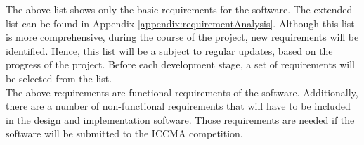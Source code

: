 The above list shows only the basic requirements for the software. The extended list can be found in Appendix \ref{appendix:requirementAnalysis}. Although this list is more comprehensive, during the course of the project, new requirements will be identified. Hence, this list will be a subject to regular updates, based on the progress of the project. Before each development stage, a set of requirements will be selected from the list. \\
The above requirements are functional requirements of the software. Additionally, there are a number of non-functional requirements that will have to be included in the design and implementation software. Those requirements are needed if the software will be submitted to the ICCMA competition. 